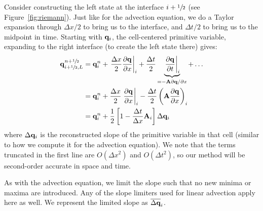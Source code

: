 Consider constructing the left state at the interface $i+{\sfrac{1}{2}}$ (see
Figure~\ref{fig:riemann}).  Just like for the advection equation, we
do a Taylor expansion through $\Delta x/2$ to bring us to the
interface, and $\Delta t/2$ to bring us to the midpoint in time.
Starting with ${\bf q}_i$, the cell-centered primitive variable, expanding
to the right interface (to create the left state there) gives:
\begin{align}
{\bf q}_{i+{\sfrac{1}{2}},L}^{n+{\sfrac{1}{2}}} &= {\bf q}_i^n +
    \left . \frac{\Delta x}{2} \frac{\partial {\bf q}}{\partial x} \right |_i +
    \frac{\Delta t}{2} \underbrace{\left .\frac{\partial {\bf q}}{\partial t} \right |_i}_{= -{\bf A} \partial {\bf q} / \partial x} + \ldots \\
&= {\bf q}_i^n + \frac{\Delta x}{2} \left . \frac{\partial {\bf q}}{\partial x} \right |_i
          - \frac{\Delta t}{2} \left ( {\bf A} \frac{\partial {\bf q}}{\partial x} \right )_i\\
&= {\bf q}_i^n + \frac{1}{2} \left [ 1 - \frac{\Delta t}{\Delta x} {\bf A}_i \right ] \Delta {\bf q}_i \label{eq:taylorstate}
\end{align}
where $\Delta {\bf q}_i$ is the reconstructed slope of the primitive
variable in that cell (similar to how we compute it for the advection
equation).  We note that the terms truncated in the first line are
$O(\Delta x^2)$ and $O(\Delta t^2)$, so our method will be second-order
accurate in space and time.

As with the advection equation, we limit the slope such that no new minima
or maxima are introduced.  Any of the slope limiters used for linear advection
apply here as well.  We represent the limited slope as $\overline{\Delta {\bf q}}_i$.

